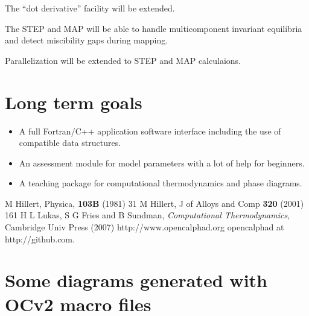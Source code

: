 \documentclass[12pt]{article}
\begin{document}
The ``dot derivative'' facility will be extended.

The STEP and MAP will be able to handle multicomponent invariant
equilibria and detect miscibility gaps during mapping.

Parallelization will be extended to STEP and MAP calculaions.

\section{Long term goals}

\begin{itemize}
\item A full Fortran/C++ application software interface including the
  use of compatible data structures.

\item An assessment module for model parameters with a lot of help for
  beginners.

\item A teaching package for computational thermodynamics and phase
  diagrams.

\end{itemize}

\begin{thebibliography}{77Zzz}
 M Hillert, Physica, {\bf 103B} (1981) 31
 M Hillert, J of Alloys and Comp {\bf 320} (2001) 161
 H L Lukas, S G Fries and B Sundman, {\em Computational
Thermodynamics}, Cambridge Univ Press (2007)
 http://www.opencalphad.org
 opencalphad at http://github.com.  
\end{thebibliography}

\newpage

\section{Some diagrams generated with OCv2 macro files}
\end{document}
